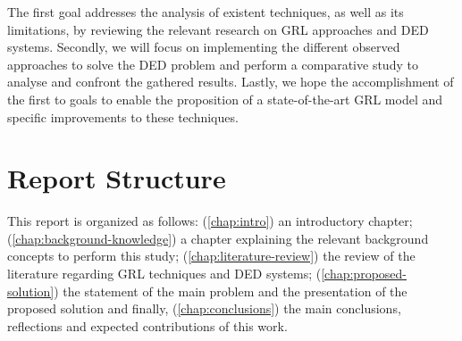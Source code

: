 The first goal addresses the analysis of existent techniques, as well as its limitations, by reviewing the relevant research on \ac{GRL} approaches and \ac{DED} systems. Secondly, we will focus on implementing the different observed approaches to solve the \ac{DED} problem and perform a comparative study to analyse and confront the gathered results. Lastly, we hope the accomplishment of the first to goals to enable the proposition of a state-of-the-art \ac{GRL} model and specific improvements to these techniques.



\section{Report Structure} \label{sec:intro-structure}

This report is organized as follows: (\ref{chap:intro}) an introductory chapter; (\ref{chap:background-knowledge}) a chapter explaining the relevant background concepts to perform this study; (\ref{chap:literature-review}) the review of the literature regarding \ac{GRL} techniques and \ac{DED} systems; (\ref{chap:proposed-solution}) the statement of the main problem and the presentation of the proposed solution and finally, (\ref{chap:conclusions}) the main conclusions, reflections and expected contributions of this work.
